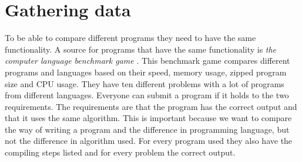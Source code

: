 



\section{Gathering data}
To be able to compare different programs they need to have the same functionality. A source for programs that have the same functionality is  \textit{the computer language benchmark game} \cite{gouy:2019}. This benchmark game compares different programs and languages based on their speed, memory usage, zipped program size and CPU usage. They have ten different problems with a lot of programs from different languages. Everyone can submit a program if it holds to the two requirements. The requirements are that the program has the correct output and that it uses the same algorithm. This is important because we want to compare the way of writing a program and the difference in programming language, but not the difference in algorithm used. For every program used they also have the compiling steps listed and for every problem the correct output.\\

